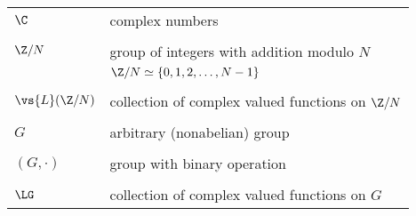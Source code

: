   \begin{center}
    \begin{tabular}{ll}
      $\C $ & complex numbers \\&\\
      $\Z/N$ & group of integers with addition modulo $N$\\
      & $\Z/N\simeq \{0, 1, 2, \ldots, N-1\}$\\&\\
      $\vs{L}(\Z/N)$ & collection of complex valued functions on $\Z/N$\\&\\
      $G $ & arbitrary (nonabelian) group\\&\\
      $(G,\cdot)$ & group with binary operation \\&\\
      $\LG $ & collection of complex valued functions on $G$
    \end{tabular}
  \end{center}

